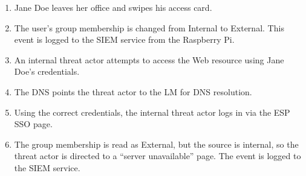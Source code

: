 \begin{enumerate}
\item Jane Doe leaves her office and swipes his access card.
\item The user's group membership is changed from Internal to
  External.  This event is logged to the SIEM service from the
  Raspberry Pi.
\item An internal threat actor attempts to access the Web resource
  using Jane Doe's credentials.
\item The DNS points the threat actor to the LM for DNS resolution.
\item Using the correct credentials, the internal threat actor logs in
  via the ESP SSO page.
\item The group membership is read as External, but the source is
  internal, so the threat actor is directed to a ``server
  unavailable'' page.  The event is logged to the SIEM service.
\end{enumerate}
